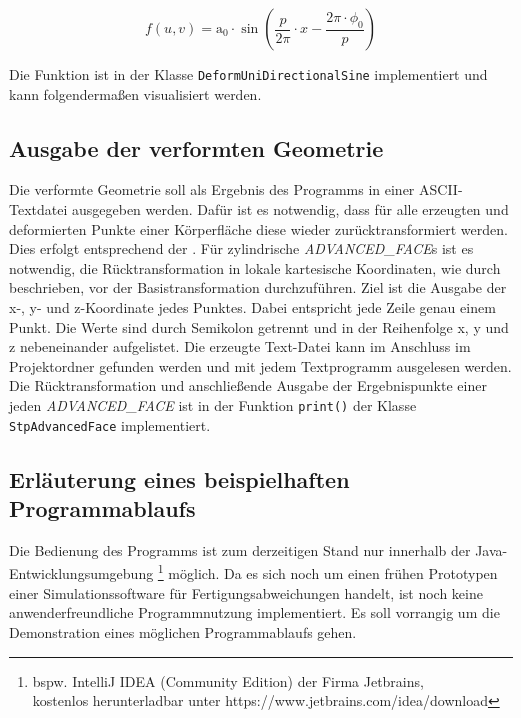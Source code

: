 \begin{equation}\label{eq:sine}
f(u,v) = \mathrm{a_0} \cdot \sin\left(\frac{p}{2\pi}\cdot x-\frac{2\pi \cdot \phi_0}{p}\right)
\end{equation} 

Die Funktion ist in der Klasse \verb|DeformUniDirectionalSine| implementiert und kann folgendermaßen visualisiert werden.










 











       


\subsection{Ausgabe der verformten Geometrie}

Die verformte Geometrie soll als Ergebnis des Programms in einer ASCII-Textdatei ausgegeben werden. Dafür ist es notwendig, dass für alle erzeugten und deformierten Punkte einer Körperfläche diese wieder zurücktransformiert werden. Dies erfolgt entsprechend der . Für zylindrische \textit{ADVANCED\_FACE}s ist es notwendig, die Rücktransformation in lokale kartesische Koordinaten, wie durch  beschrieben, vor der Basistransformation durchzuführen. 
Ziel ist die Ausgabe der x-, y- und z-Koordinate jedes Punktes. Dabei entspricht jede Zeile genau einem Punkt. Die Werte sind durch Semikolon getrennt und in der Reihenfolge x, y und z nebeneinander aufgelistet. Die erzeugte Text-Datei kann im Anschluss im Projektordner  gefunden werden und mit jedem Textprogramm ausgelesen werden. Die Rücktransformation und anschließende Ausgabe der Ergebnispunkte einer jeden \textit{ADVANCED\_FACE} ist in der Funktion \verb|print()| der Klasse \verb|StpAdvancedFace| implementiert.

\subsection{Erläuterung eines beispielhaften Programmablaufs}

Die Bedienung des Programms ist zum derzeitigen Stand nur innerhalb der Java-Ent\-wick\-lungs\-um\-geb\-ung \footnote{bspw. IntelliJ IDEA (Community Edition) der Firma Jetbrains,\\ kostenlos herunterladbar unter https://www.jetbrains.com/idea/download} möglich. Da es sich noch um einen frühen Prototypen einer Simulationssoftware für Fertigungsabweichungen handelt, ist noch keine anwenderfreundliche Programmnutzung implementiert. Es soll vorrangig um die Demonstration eines möglichen Programmablaufs gehen. 

